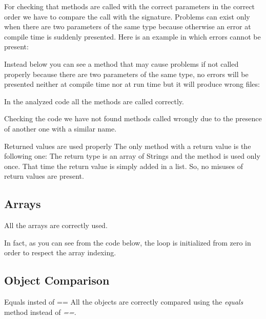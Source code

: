 \documentclass[9pt]{beamer}
\makeatletter
\newcommand*{\currentname}{\@currentlabelname}
\makeatother
\begin{document}
\begin{frame}[allowframebreaks]{\currentname}

For checking that methods are called with the correct parameters in the correct order we have to compare the call with the signature. Problems can exist only when there are two parameters of the same type because otherwise an error at compile time is suddenly presented. \newline
Here is an example in which errors cannot be present: 

Instead below you can see a method that may cause problems if not called properly because there are two parameters of the same type, no errors will be presented neither at compile time nor at run time but it will produce wrong files:

\framebreak

\begin{exampleblock}{In the analyzed code all the methods are called correctly.}

Checking the code we have not found methods called wrongly due to the presence of another one with a similar name.
\end{exampleblock}

\begin{exampleblock}{Returned values are used properly}
The only method with a return value is the following one:
The return type is an array of Strings and the method is used only once. That time the return value is simply added in a list. So, no misuses of return values are present.
\end{exampleblock}

\end{frame}
\subsection{Arrays}

\begin{frame}{\currentname}

\begin{exampleblock}{}
All the arrays are correctly used. 

In fact, as you can see from the code below, the loop is initialized from zero in order to respect the array indexing.
\end{exampleblock}
\end{frame}

\subsection{Object Comparison}
\begin{frame}{\currentname}
\begin{exampleblock}{Equals insted of ==}
All the objects are correctly compared using the \emph{equals} method instead of \emph{==}.
\end{exampleblock}
\end{frame}
\end{document}
